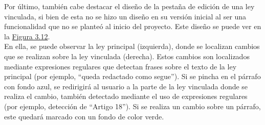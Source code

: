 Por último, también cabe destacar el diseño de la pestaña de edición de una ley vinculada, si bien de esta no se hizo un diseño en su versión inicial al ser una funcionalidad que no se planteó al inicio del proyecto. Este diseño se puede ver en la \hyperref[enlacePLeyVinculadaDiseno]{Figura 3.12}.
\\

En ella, se puede observar la ley principal (izquierda), donde se localizan cambios que se realizan sobre la ley vinculada (derecha). Estos cambios son localizados mediante expresiones regulares que detectan frases sobre el texto de la ley principal (por ejemplo, ``queda redactado como segue''). Si se pincha en el párrafo con fondo azul, se redirigirá al usuario a la parte de la ley vinculada donde se realiza el cambio, también detectado mediante el uso de expresiones regulares (por ejemplo, detección de ``Artigo 18''). Si se realiza un cambio sobre un párrafo, este quedará marcado con un fondo de color verde.